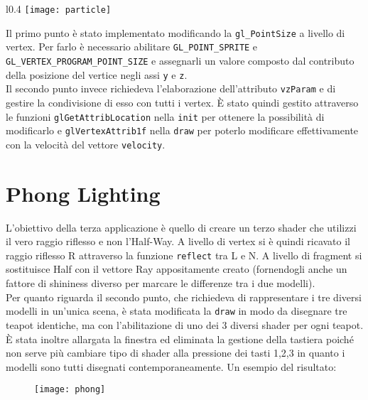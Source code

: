 \begin{wrapfigure}{l}{0.4\textwidth} %
    \centering
    \texttt{[image: particle]}
    \caption{\label{fig:particle}}
\end{wrapfigure}

Il primo punto è stato implementato modificando la \texttt{gl\_PointSize} a livello di vertex. Per farlo è necessario abilitare \texttt{GL\-\_POINT\-\_SPRITE} e \texttt{GL\-\_VERTEX\-\_PROGRAM\-\_POINT\-\_SIZE} e assegnarli un valore composto dal contributo della posizione del vertice negli assi \texttt{y} e \texttt{z}.\\

Il secondo punto invece richiedeva l'elaborazione dell'attributo \texttt{vzParam} e di gestire la condivisione di esso con tutti i vertex.  È stato quindi gestito attraverso le funzioni \texttt{glGetAttribLocation} nella \texttt{init} per ottenere la possibilità di modificarlo e \texttt{glVertexAttrib1f} nella \texttt{draw} per poterlo modificare effettivamente con la velocità del vettore \texttt{velocity}.


\section{Phong Lighting}
L'obiettivo della terza applicazione è quello di creare un terzo shader che utilizzi il vero raggio riflesso e non l'Half-Way. A livello di vertex si è quindi ricavato il raggio riflesso R attraverso la funzione \texttt{reflect} tra L e N. A livello di fragment si sostituisce Half con il vettore Ray appositamente creato (fornendogli anche un fattore di shininess diverso per marcare le differenze tra i due modelli). \\
Per quanto riguarda il secondo punto, che richiedeva di rappresentare i tre diversi modelli in un'unica scena, è stata modificata la \texttt{draw} in modo da disegnare tre teapot identiche, ma con l'abilitazione di uno dei 3 diversi shader per ogni teapot. È stata inoltre allargata la finestra ed eliminata la gestione della tastiera poiché non serve più cambiare tipo di shader alla pressione dei tasti 1,2,3 in quanto i modelli sono tutti disegnati contemporaneamente.
Un esempio del risultato:
 \begin{figure}[htb]
    \centering
    \texttt{[image: phong]}
    \caption{\label{fig:phong}}
\end{figure}

